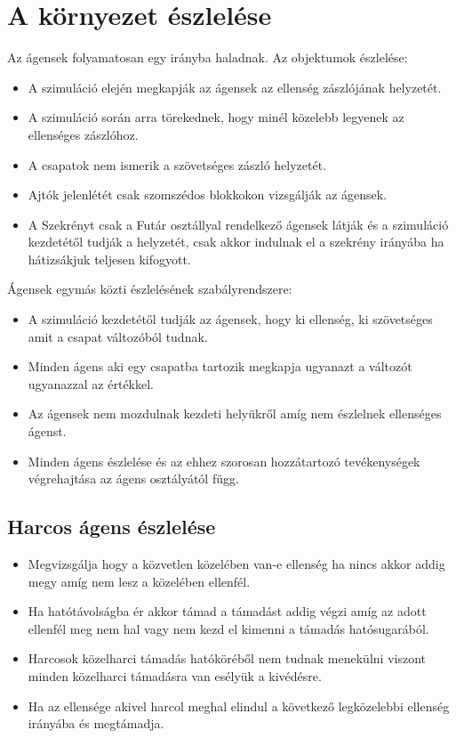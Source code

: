 \section{A környezet észlelése}

Az ágensek folyamatosan egy irányba haladnak.
\newline
Az objektumok észlelése:
\begin{itemize}
\item A szimuláció elején megkapják az ágensek az ellenség zászlójának helyzetét.
\item A szimuláció során arra törekednek, hogy minél közelebb legyenek az ellenséges zászlóhoz.
\item A csapatok nem ismerik a szövetséges zászló helyzetét.
\item Ajtók jelenlétét csak szomszédos blokkokon vizsgálják az ágensek.
\item A Szekrényt csak a Futár osztállyal rendelkező ágensek látják és a szimuláció kezdetétől tudják a helyzetét, csak akkor indulnak el a szekrény irányába ha hátizsákjuk teljesen kifogyott.
\end{itemize}

\noindent Ágensek egymás közti észlelésének szabályrendszere:

\begin{itemize}
	\item A szimuláció kezdetétől tudják az ágensek, hogy ki ellenség, ki szövetséges amit a csapat változóból tudnak.
	\item Minden ágens aki egy csapatba tartozik megkapja ugyanazt a változót ugyanazzal az értékkel.
	\item Az ágensek nem mozdulnak kezdeti helyükről amíg nem észlelnek ellenséges ágenst.
	\item Minden ágens észlelése és az ehhez szorosan hozzátartozó tevékenységek végrehajtása az ágens osztályától függ. 
\end{itemize}

\subsection{Harcos ágens észlelése}

\begin{itemize}
  \item Megvizsgálja hogy a közvetlen közelében van-e ellenség ha nincs akkor addig megy amíg nem lesz a közelében ellenfél.
  \item Ha hatótávolságba ér akkor támad a támadást addig végzi amíg az adott ellenfél meg nem hal vagy nem kezd el kimenni a támadás hatósugarából.
  \item Harcosok közelharci támadás hatóköréből nem tudnak menekülni viszont minden közelharci támadásra van esélyük a kivédésre.
  \item Ha az ellensége akivel harcol meghal elindul a következő legközelebbi ellenség irányába és megtámadja.
\end{itemize}

